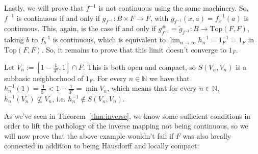\begin{example}
Lastly, we will prove that $f^{-1}$ is not continuous using the same machinery. So, $f^{-1}$ is continuous if and only if $g_{f^{-1}}:B\times F\to F$, with $g_{f^{-1}}(x,a)=f^{-1}_x(a)$ is continuous. This, again, is the case if and only if $g_{f^{-1}}^{\#}=\tilde{g}_{f^{-1}}:B\to\mathrm{Top}(F,F)$, taking $b$ to $f_b^{-1}$ is continuous, which is equivalent to $\lim_{n\to\infty}h_n^{-1}=1_F^{-1}=1_F$ in $\mathrm{Top}(F,F)$. So, it remains to prove that this limit doesn't converge to $1_F$.

Let $V_n:=[1-\frac{1}{3^n},1]\cap F$. This is both open and compact, so $S(V_n,V_n)$ is a subbasic neighborhood of $1_F$. For every $n\in\mathbb{N}$ we have that $h_n^{-1}(1)=\frac{1}{3^n}<1-\frac{1}{3^n}=\min V_n$, which means that for every $n\in\mathbb{N}$, $h_n^{-1}(V_n)\not\subseteq V_n$, i.e. $h^{-1}_n\not\in S(V_n,V_n)$.
\end{example}

As we've seen in Theorem~\ref{thm:inverse}, we know some sufficient conditions in order to lift the pathology of the inverse mapping not being continuous, so we will now prove that the above example wouldn't fail if $F$ was also locally connected in addition to being Hausdorff and locally compact:

